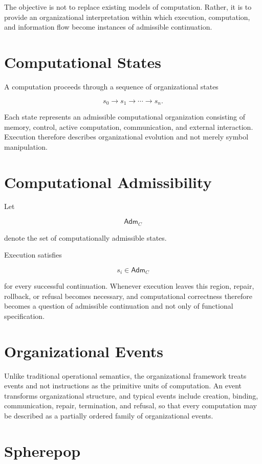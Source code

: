 \documentclass[11pt,oneside]{book}
\numberwithin{equation}{chapter}
\theoremstyle{definition}
\theoremstyle{plain}
\newcommand{\Adm}{\mathsf{Adm}}
\begin{document}
The objective is not to replace existing models of computation. Rather,
it is to provide an organizational interpretation within which execution,
computation, and information flow become instances of admissible
continuation.

\section{Computational States}

A computation proceeds through a sequence of organizational states

\[
s_0
\rightarrow
s_1
\rightarrow
\cdots
\rightarrow
s_n.
\]

Each state represents an admissible computational organization consisting of memory, control, active computation, communication, and external interaction. Execution therefore describes organizational evolution and not merely symbol manipulation.

\section{Computational Admissibility}

Let

\[
\Adm_C
\]

denote the set of computationally admissible states.

Execution satisfies

\[
s_i
\in
\Adm_C
\]

for every successful continuation. Whenever execution leaves this region, repair, rollback, or refusal becomes necessary, and computational correctness therefore becomes a question of admissible continuation and not only of functional specification.

\section{Organizational Events}

Unlike traditional operational semantics, the organizational framework treats events and not instructions as the primitive units of computation. An event transforms organizational structure, and typical events include creation, binding, communication, repair, termination, and refusal, so that every computation may be described as a partially ordered family of organizational events.

\section{Spherepop}
\end{document}

